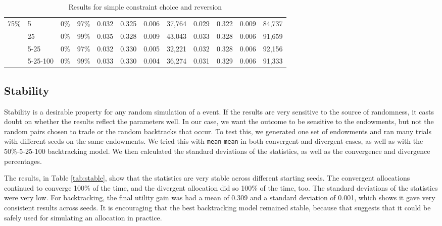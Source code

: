 \documentclass[12pt,a4paper,titlepage]{article}
\newcommand{\co}[1]{\texttt{#1}}
\begin{document}
\begin{sidewaystable}
\begin{tabular}{rl|rr|rrrr|rrrr}
    \multicolumn{ 1}{l}{75\%} & 5 & 0\% & 97\% & 0.032 & 0.325 & 0.006 & 37,764 & 0.029 & 0.322 & 0.009 & 84,737 \\ 
    \multicolumn{ 1}{r}{} & 25 & 0\% & 99\% & 0.035 & 0.328 & 0.009 & 43,043 & 0.033 & 0.328 & 0.006 & 91,659 \\ 
    \multicolumn{ 1}{l}{} & 5-25 & 0\% & 97\% & 0.032 & 0.330 & 0.005 & 32,221 & 0.032 & 0.328 & 0.006 & 92,156 \\ 
    \multicolumn{ 1}{l}{} & 5-25-100 & 0\% & 99\% & 0.033 & 0.330 & 0.004 & 36,274 & 0.031 & 0.329 & 0.006 & 91,333 \\ 
  \end{tabular}
  \caption{Results for simple constraint choice and reversion}
  \label{tab:bt2}
\end{sidewaystable}


\subsection{Stability}
Stability is a desirable property for any random simulation of a event.
If the results are very sensitive to the source of randomness, it casts doubt on whether the results reflect the parameters well.
In our case, we want the outcome to be sensitive to the endowments, but not the random pairs chosen to trade or the random backtracks that occur. 
To test this, we generated one set of endowments and ran many trials with different seeds on the same endowments.
We tried this with \co{mean}-\co{mean} in both convergent and divergent cases, as well as with the 50\%-5-25-100 backtracking model.
We then calculated the standard deviations of the statistics, as well as the convergence and divergence percentages.

The results, in Table \ref{tab:stable}, show that the statistics are very stable across different starting seeds.
The convergent allocations continued to converge 100\% of the time, and the divergent allocation did so 100\% of the time, too.
The standard deviations of the statistics were very low.
For backtracking, the final utility gain was had a mean of 0.309 and a standard deviation of 0.001, which shows it gave very consistent results across seeds.
It is encouraging that the best backtracking model remained stable, because that suggests that it could be safely used for simulating an allocation in practice.
\end{document}
